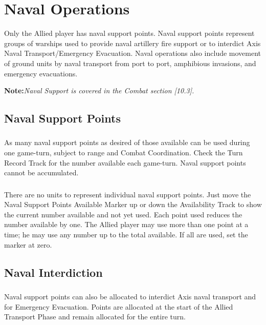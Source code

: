 \section{Naval Operations}

Only the Allied player has naval support points. Naval support points represent groups of warships used to provide naval artillery fire support or to interdict Axis Naval Transport/Emergency Evacuation. Naval operations also include movement of ground units by naval transport from port to port, amphibious invasions, and emergency evacuations.

\textbf{Note:}\textit{Naval Support is covered in the Combat section [10.3].}

\subsection{Naval Support Points}
\subsubsection{} As many naval support points as desired of those available can be used during one game-turn, subject to range and Combat Coordination. Check the Turn Record Track for the number available each game-turn. Naval support points cannot be accumulated.

\subsubsection{} There are no units to represent individual naval support points. Just move the Naval Support Points Available Marker up or down the Availability Track to show the current number available and not yet used. Each point used reduces the number available by one. The Allied player may use more than one point at a time; he may use any number up to the total available. If all are used, set the marker at zero.

\subsection{Naval Interdiction}
\subsubsection{} Naval support points can also be allocated to interdict Axis naval transport and for Emergency Evacuation. Points are allocated at the start of the Allied Transport Phase and remain allocated for the entire turn.

